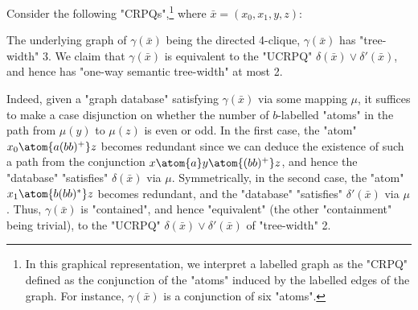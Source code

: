 \begin{example}
    \AP\label{ex:CRPQ-tw3-stw2}
    Consider the following "CRPQs",\footnote{In this graphical representation,
	we interpret a labelled graph as the "CRPQ" defined as
	the conjunction of the "atoms" induced by the labelled edges of the graph.
	For instance, $\gamma(\bar x)$ is a conjunction of six "atoms".}
    where $\bar x = (x_0,x_1,y,z)$:\leavevmode
    \begin{center}
        \small
    \end{center}
    \noindent
    The underlying graph of $\gamma(\bar x)$ being the directed 4-clique, $\gamma 
    (\bar x)$ has "tree-width" 3. We claim that $\gamma(\bar x)$ is equivalent to the "UCRPQ"
    $\delta(\bar x) \lor \delta'(\bar x)$, and hence has "one-way semantic tree-width" at most 2.

    Indeed, given a "graph database" satisfying $\gamma(\bar x)$ via some mapping $\mu$, 
    it suffices to make a case disjunction on whether the number of $b$-labelled "atoms"
    in the path from
    $\mu(y)$ to $\mu(z)$ is even or odd. In the first case, the "atom" $x_0\atom{a(bb)^+} z$ becomes
    redundant since we can deduce the existence of such a path from the conjunction
    $x \atom{a} y \atom{(bb)^+} z$, and hence the "database" "satisfies" $\delta(\bar x)$ via $\mu$.
    Symmetrically, in the second case, the "atom" $x_1 \atom{b(bb)^*} z$ becomes redundant,
    and the "database" "satisfies" $\delta'(\bar x)$ via $\mu$. 
    Thus, $\gamma(\bar x)$
    is "contained", and hence "equivalent" (the other "containment" being trivial), to
    the "UCRPQ" $\delta(\bar x) \lor \delta'(\bar x)$ of "tree-width" 2.
\end{example}

